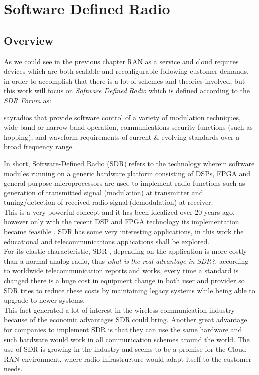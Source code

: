 \chapter{Software Defined Radio}

\section{Overview}
\label{sdr:overview}

As we could see in the previous chapter RAN as a service and cloud requires
devices which are both scalable and reconfigurable following customer demands,
in order to accomplish that there is a lot of schemes and theories involved, but
this work will focus on \emph{Software Defined Radio} which is defined according
to the \emph{SDR Forum} \cite{web:sdrforum} as:

say{radios that provide software control of a variety of modulation techniques,
wide-band or narrow-band operation, communications security functions (such as
hopping), and waveform requirements of current \& evolving standards over a
broad frequency range.}

In short, Software-Defined Radio (SDR) refers to the technology wherein software
modules running on a generic hardware platform consisting of DSPs, FPGA and
general purpose microprocessors are used to implement radio functions such as
generation of transmitted signal (modulation) at transmitter and
tuning/detection of received radio signal (demodulation) at receiver.\\

This is a very powerful concept and it has been idealized over 20 years ago,
however only with the recent DSP and FPGA technology its implementation became
feasible \cite{ladimer2009}. SDR has some very interesting applications, in this
work the educational and telecommunications applications shall be explored.\\

For its elastic characteristic, SDR , depending on the application is more
costly than a normal analog radio, thus \emph{what is the real advantage in
SDR?}, according to worldwide telecommunication reports and works, every time a
standard is changed there is a huge cost in equipment change in both user and
provider so SDR tries to reduce these costs by maintaining legacy systems while
being able to upgrade to newer systems\cite{dayananda2012}.\\

This fact generated a lot of interest in the wireless communication industry
because of the economic advantages SDR could bring. Another great advantage for
companies to implement SDR is that they can use the same hardware and such
hardware would work in all communication schemes around the world. The use of
SDR is growing in the industry and seems to be a promise for the Cloud-RAN
environment, where radio infrastructure would adapt itself to the customer
needs.

